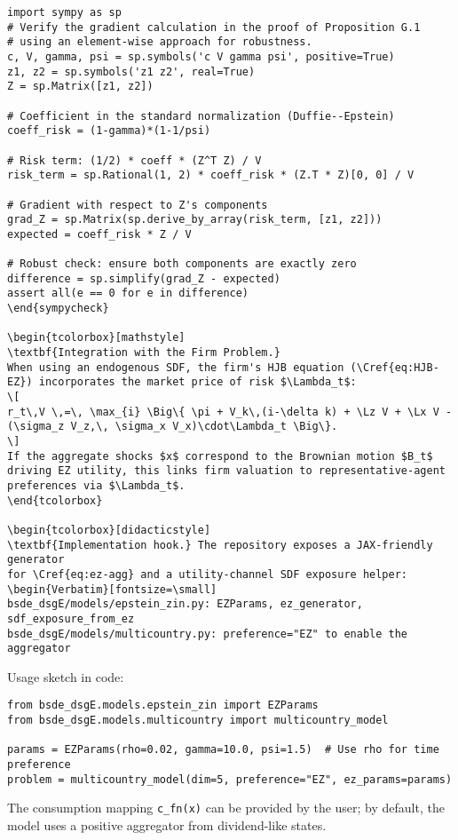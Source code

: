 ﻿\documentclass[11pt,letterpaper,oneside]{article}
\numberwithin{equation}{section}
\newenvironment{sympycheck}
  {\begin{tcolorbox}[sympycheckstyle]\VerbatimEnvironment\begin{verbatim}}
  {\end{verbatim}\end{tcolorbox}}
\renewenvironment{sympycheck}{\VerbatimEnvironment\begin{tcolorbox}[sympycheckstyle]\begin{Verbatim}[fontsize=\small]}{\end{Verbatim}\end{tcolorbox}}
\newcommand{\1}{\mathbf{1}}
\newcommand{\Lz}{L\_z}
\newcommand{\Lx}{L\_x}
\begin{document}
\begin{sympycheck}
import sympy as sp
# Verify the gradient calculation in the proof of Proposition G.1
# using an element-wise approach for robustness.
c, V, gamma, psi = sp.symbols('c V gamma psi', positive=True)
z1, z2 = sp.symbols('z1 z2', real=True)
Z = sp.Matrix([z1, z2])

# Coefficient in the standard normalization (Duffie--Epstein)
coeff_risk = (1-gamma)*(1-1/psi)

# Risk term: (1/2) * coeff * (Z^T Z) / V
risk_term = sp.Rational(1, 2) * coeff_risk * (Z.T * Z)[0, 0] / V

# Gradient with respect to Z's components
grad_Z = sp.Matrix(sp.derive_by_array(risk_term, [z1, z2]))
expected = coeff_risk * Z / V

# Robust check: ensure both components are exactly zero
difference = sp.simplify(grad_Z - expected)
assert all(e == 0 for e in difference)
\end{sympycheck}

\begin{tcolorbox}[mathstyle]
\textbf{Integration with the Firm Problem.}
When using an endogenous SDF, the firm's HJB equation (\Cref{eq:HJB-EZ}) incorporates the market price of risk $\Lambda_t$:
\[
r_t\,V \,=\, \max_{i} \Big\{ \pi + V_k\,(i-\delta k) + \Lz V + \Lx V - (\sigma_z V_z,\, \sigma_x V_x)\cdot\Lambda_t \Big\}.
\]
If the aggregate shocks $x$ correspond to the Brownian motion $B_t$ driving EZ utility, this links firm valuation to representative-agent preferences via $\Lambda_t$.
\end{tcolorbox}

\begin{tcolorbox}[didacticstyle]
\textbf{Implementation hook.} The repository exposes a JAX-friendly generator
for \Cref{eq:ez-agg} and a utility-channel SDF exposure helper:
\begin{Verbatim}[fontsize=\small]
bsde_dsgE/models/epstein_zin.py: EZParams, ez_generator, sdf_exposure_from_ez
bsde_dsgE/models/multicountry.py: preference="EZ" to enable the aggregator
\end{Verbatim}
Usage sketch in code:
\begin{Verbatim}[fontsize=\small]
from bsde_dsgE.models.epstein_zin import EZParams
from bsde_dsgE.models.multicountry import multicountry_model

params = EZParams(rho=0.02, gamma=10.0, psi=1.5)  # Use rho for time preference
problem = multicountry_model(dim=5, preference="EZ", ez_params=params)
\end{Verbatim}
The consumption mapping \verb|c_fn(x)| can be provided by the user; by default,
the model uses a positive aggregator from dividend-like states.
\end{tcolorbox}
\end{document}
